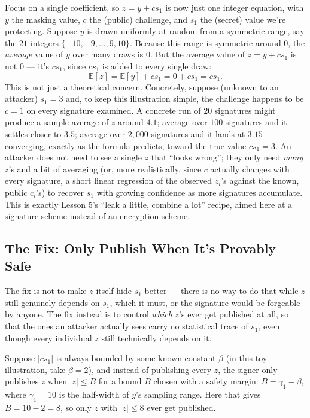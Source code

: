 Focus on a single coefficient, so $z = y + cs_1$ is now just one integer equation, with $y$ the masking value, $c$ the (public) challenge, and $s_1$ the (secret) value we're protecting. Suppose $y$ is drawn uniformly at random from a symmetric range, say the $21$ integers $\{-10,-9,\ldots,9,10\}$. Because this range is symmetric around $0$, the \emph{average} value of $y$ over many draws is $0$. But the average value of $z=y+cs_1$ is not $0$ --- it's $cs_1$, since $cs_1$ is added to every single draw:
$$
\mathbb{E}[z] = \mathbb{E}[y] + cs_1 = 0 + cs_1 = cs_1.
$$
This is not just a theoretical concern. Concretely, suppose (unknown to an attacker) $s_1=3$ and, to keep this illustration simple, the challenge happens to be $c=1$ on every signature examined. A concrete run of $20$ signatures might produce a sample average of $z$ around $4.1$; average over $100$ signatures and it settles closer to $3.5$; average over $2{,}000$ signatures and it lands at $3.15$ --- converging, exactly as the formula predicts, toward the true value $cs_1=3$. An attacker does not need to see a single $z$ that ``looks wrong''; they only need \emph{many} $z$'s and a bit of averaging (or, more realistically, since $c$ actually changes with every signature, a short linear regression of the observed $z_i$'s against the known, public $c_i$'s) to recover $s_1$ with growing confidence as more signatures accumulate. This is exactly Lesson 5's ``leak a little, combine a lot'' recipe, aimed here at a signature scheme instead of an encryption scheme.

\subsection{The Fix: Only Publish When It's Provably Safe}
\label{sec:L4:the-fix-only-publish-when-its-provably-s}

The fix is not to make $z$ itself hide $s_1$ better --- there is no way to do that while $z$ still genuinely depends on $s_1$, which it must, or the signature would be forgeable by anyone. The fix instead is to control \emph{which} $z$'s ever get published at all, so that the ones an attacker actually sees carry no statistical trace of $s_1$, even though every individual $z$ still technically depends on it.

Suppose $|cs_1|$ is always bounded by some known constant $\beta$ (in this toy illustration, take $\beta=2$), and instead of publishing every $z$, the signer only publishes $z$ when $|z| \le B$ for a bound $B$ chosen with a safety margin: $B = \gamma_1 - \beta$, where $\gamma_1=10$ is the half-width of $y$'s sampling range. Here that gives $B = 10-2=8$, so only $z$ with $|z|\le 8$ ever get published.

